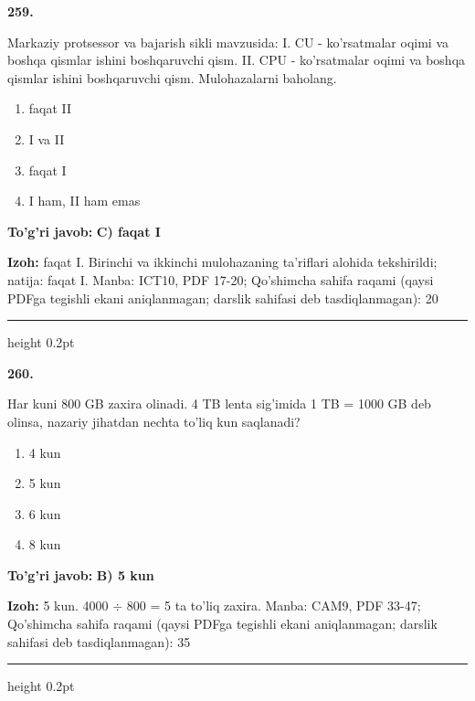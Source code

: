 \documentclass[10pt,a4paper]{article}
\begin{document}
{\bfseries\sffamily\color{ink} 259.}
\par
Markaziy protsessor va bajarish sikli mavzusida: I. CU - ko'rsatmalar oqimi va boshqa qismlar ishini boshqaruvchi qism. II. CPU - ko'rsatmalar oqimi va boshqa qismlar ishini boshqaruvchi qism. Mulohazalarni baholang.
\begin{enumerate}[label=\Alph*),leftmargin=9mm]
\item faqat II
\item I va II
\item faqat I
\item I ham, II ham emas
\end{enumerate}
\begin{tcolorbox}[enhanced,breakable,colback=teal!4,colframe=teal!60!black,boxrule=0.45pt,arc=1.2mm,left=2.7mm,right=2.7mm,top=1.8mm,bottom=1.8mm,before skip=2mm,after skip=2mm]
{\bfseries\sffamily\color{teal}To'g'ri javob:} \textbf{C) faqat I}
\par\smallskip
{\bfseries Izoh:} faqat I. Birinchi va ikkinchi mulohazaning ta'riflari alohida tekshirildi; natija: faqat I. Manba: ICT10, PDF 17-20; Qo'shimcha sahifa raqami (qaysi PDFga tegishli ekani aniqlanmagan; darslik sahifasi deb tasdiqlanmagan): 20
\end{tcolorbox}
\vspace{2mm}\hrule height 0.2pt\vspace{3mm}

{\bfseries\sffamily\color{ink} 260.}
\par
Har kuni 800 GB zaxira olinadi. 4 TB lenta sig'imida 1 TB = 1000 GB deb olinsa, nazariy jihatdan nechta to'liq kun saqlanadi?
\begin{enumerate}[label=\Alph*),leftmargin=9mm]
\item 4 kun
\item 5 kun
\item 6 kun
\item 8 kun
\end{enumerate}
\begin{tcolorbox}[enhanced,breakable,colback=teal!4,colframe=teal!60!black,boxrule=0.45pt,arc=1.2mm,left=2.7mm,right=2.7mm,top=1.8mm,bottom=1.8mm,before skip=2mm,after skip=2mm]
{\bfseries\sffamily\color{teal}To'g'ri javob:} \textbf{B) 5 kun}
\par\smallskip
{\bfseries Izoh:} 5 kun. 4000 \ensuremath{\div} 800 = 5 ta to'liq zaxira. Manba: CAM9, PDF 33-47; Qo'shimcha sahifa raqami (qaysi PDFga tegishli ekani aniqlanmagan; darslik sahifasi deb tasdiqlanmagan): 35
\end{tcolorbox}
\vspace{2mm}\hrule height 0.2pt\vspace{3mm}
\end{document}
